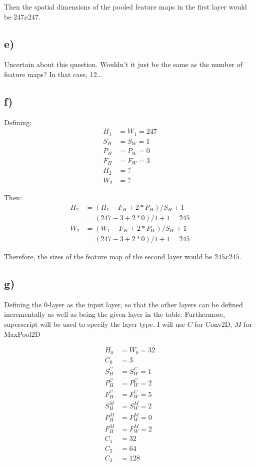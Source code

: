 Then the spatial dimensions of the pooled feature maps in the first layer would be $247x247$. 

\subsection*{e)}
Uncertain about this question. Wouldn't it just be the same as the number of feature maps? In that case, 12... 

\subsection*{f)}
Defining: 
\begin{align*}
    H_1 &= W_1 = 247 \\
    S_H &= S_W = 1 \\
    P_H &= P_W = 0 \\
    F_H &= F_W = 3 \\
    H_2 &= ? \\
    W_2 &= ?
\end{align*}

Then: 
\begin{align*}
    H_2 &= (H_1 - F_H + 2 * P_H) / S_H + 1 \\
    &= (247 - 3 + 2 * 0) / 1 + 1 = 245 \\
    W_2 &= (W_1 - F_W + 2 * P_W) / S_W + 1 \\
    &= (247 - 3 + 2 * 0) / 1 + 1 = 245
\end{align*}

Therefore, the sizes of the feature map of the second layer would be $245 x 245$. 

\subsection*{g)}
Defining the $0$-layer as the input layer, so that the other layers can be defined incrementally as well as being the given layer in the table. Furthermore, superscript will be used to specify the layer type. I will use $C$ for Conv2D, $M$ for MaxPool2D

\begin{align*}
    H_0 &= W_0 = 32 \\
    C_0 &= 3 \\
    S_H^C &= S_W^C = 1 \\
    P_H^C &= P_W^C = 2 \\
    F_H^C &= F_W^C = 5 \\
    S_H^M &= S_W^M = 2 \\
    P_H^M &= P_W^M = 0 \\
    F_H^M &= F_W^M = 2 \\
    C_1 &= 32 \\ 
    C_2 &= 64 \\
    C_3 &= 128
\end{align*}

